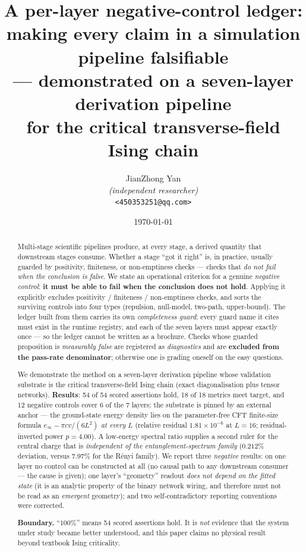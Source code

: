 \documentclass[11pt,a4paper]{article}
\title{\bfseries A per-layer negative-control ledger:\\[2pt]
making every claim in a simulation pipeline falsifiable\\[8pt]
\large --- demonstrated on a seven-layer derivation pipeline\\
\large for the critical transverse-field Ising chain}
\author{%
  \normalsize JianZhong Yan\\
  \small \textit{(independent researcher)}\\
  \small \texttt{<450353251@qq.com>}
}
\date{\today}
\begin{document}
\maketitle

\begin{abstract}
\noindent
Multi-stage scientific pipelines produce, at every stage, a derived quantity that
downstream stages consume. Whether a stage ``got it right'' is, in practice,
usually guarded by positivity, finiteness, or non-emptiness checks --- checks that
\emph{do not fail when the conclusion is false}. We state an operational criterion
for a genuine \emph{negative control}: \textbf{it must be able to fail when the
conclusion does not hold}. Applying it explicitly excludes positivity / finiteness /
non-emptiness checks, and sorts the surviving controls into four types
(repulsion, null-model, two-path, upper-bound). The ledger built from them carries
its own \emph{completeness guard}: every guard name it cites must exist in the
runtime registry, and each of the seven layers must appear exactly once --- so the
ledger cannot be written as a brochure. Checks whose guarded proposition is
\emph{measurably false} are registered as \emph{diagnostics} and are
\textbf{excluded from the pass-rate denominator}; otherwise one is grading oneself
on the easy questions.

We demonstrate the method on a seven-layer derivation pipeline whose validation
substrate is the critical transverse-field Ising chain (exact diagonalisation plus
tensor networks). \textbf{Results}: 54 of 54 scored assertions hold, 18 of 18
metrics meet target, and 12 negative controls cover 6 of the 7 layers; the
substrate is pinned by an external anchor --- the ground-state energy density lies
on the parameter-free CFT finite-size formula $e_\infty-\pi cv/(6L^2)$ \emph{at
every} $L$ (relative residual $1.81\times10^{-6}$ at $L{=}16$; residual-inverted
power $p=4.00$). A low-energy spectral ratio supplies a second ruler for the
central charge that is \emph{independent of the entanglement-spectrum family}
($0.212\%$ deviation, versus $7.97\%$ for the Rényi family). We report three
\emph{negative} results: on one layer no control can be constructed at all (no
causal path to any downstream consumer --- the cause is given); one layer's
``geometry'' readout \emph{does not depend on the fitted state} (it is an analytic
property of the binary network wiring, and therefore must not be read as an
\emph{emergent} geometry); and two self-contradictory reporting conventions were
corrected.

\smallskip
\noindent\textbf{Boundary.} ``$100\%$'' means 54 scored assertions hold. It is
\emph{not} evidence that the system under study became better understood, and this
paper claims no physical result beyond textbook Ising criticality.
\end{abstract}
\end{document}
